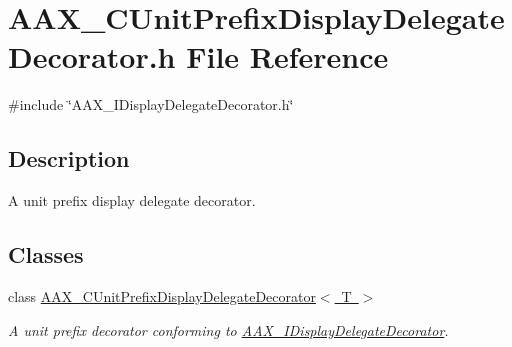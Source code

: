 \hypertarget{a00485}{}\section{A\+A\+X\+\_\+\+C\+Unit\+Prefix\+Display\+Delegate\+Decorator.\+h File Reference}
\label{a00485}
{\ttfamily \#include \char`\"{}A\+A\+X\+\_\+\+I\+Display\+Delegate\+Decorator.\+h\char`\"{}}\newline


\subsection{Description}
A unit prefix display delegate decorator. 

\subsection*{Classes}
\begin{DoxyCompactItemize}
\item 
class \mbox{\hyperlink{a01589}{A\+A\+X\+\_\+\+C\+Unit\+Prefix\+Display\+Delegate\+Decorator$<$ T $>$}}
\begin{DoxyCompactList}\small\item\em A unit prefix decorator conforming to \mbox{\hyperlink{a01805}{A\+A\+X\+\_\+\+I\+Display\+Delegate\+Decorator}}. \end{DoxyCompactList}\end{DoxyCompactItemize}

